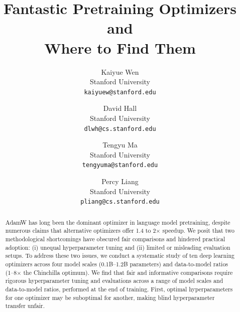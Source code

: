 \documentclass{article}
\title{Fantastic Pretraining Optimizers and \\ Where to Find Them}
\author{
Kaiyue Wen \\
Stanford University\\
\texttt{kaiyuew@stanford.edu} 
\and
David Hall  \\
Stanford University\\
\texttt{dlwh@cs.stanford.edu} \\
\and
Tengyu Ma  \\
Stanford University\\
\texttt{tengyuma@stanford.edu} \\
\and
Percy Liang  \\
Stanford University\\
\texttt{pliang@cs.stanford.edu} \\
}
\newcommand{\kaiyue}[1]{{\color{green}{KY:#1}}}
\newcommand{\tnote}[1]{{\color{red}{[TM:#1]}}}
\newcommand{\pl}[1]{{\color{blue}{Percy:#1}}}
\begin{document}
\maketitle
\begin{abstract}
AdamW has long been the dominant optimizer in language model pretraining, despite numerous claims that alternative optimizers offer 1.4 to 2$\times$ speedup. We posit that two methodological shortcomings have obscured fair comparisons and hindered practical adoption: (i) unequal hyperparameter tuning and (ii) limited or misleading evaluation setups.
To address these two issues, we conduct a systematic study of ten deep learning optimizers across four model scales (0.1B–1.2B parameters) and data-to-model ratios (1--8$\times$ the Chinchilla optimum). We find that fair and informative comparisons require rigorous hyperparameter tuning and evaluations across a range of model scales and data-to-model ratios, performed at the end of training.
First, optimal hyperparameters for one optimizer may be suboptimal for another, making blind hyperparameter transfer unfair. 

\end{abstract}
\end{document}
